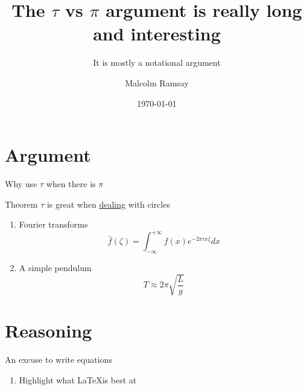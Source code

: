 \documentclass[aspectratio=169, 22pt]{beamer}
\title{The $\tau$ vs $\pi$ argument is really long and interesting}
\subtitle{It is mostly a notational argument}
\date{\today}
\author[Malcolm]{Malcolm Ramsay}
\begin{document}
\begin{frame}
  \titlepage{}
\end{frame}

\section{Argument}

\begin{frame}{Why use $\tau$ when there is $\pi$}
  \begin{block}{Theorem}
    $\tau$ is great when \href{http://blah}{dealing} with circles
  \end{block}

  \begin{enumerate}
    \item<1-> Fourier transforms
      \begin{equation}
        \hat f(\zeta) = \int_{-\infty}^{+\infty} f(x) e^{-2\pi ix\zeta} dx
      \end{equation}
    \item<2-> A simple pendulum
      \begin{equation}
        T \approx 2\pi \sqrt{\frac{L}{g}}
      \end{equation}
  \end{enumerate}
\end{frame}

\section{Reasoning}

\begin{frame}{An excuse to write equations}
  \begin{enumerate}
    \item Highlight what \LaTeX is best at
  \end{enumerate}
\end{frame}
\end{document}
